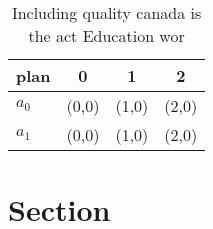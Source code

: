 \documentclass[a4paper]{article}
\begin{document}
\begin{table}
\begin{adjustbox}{width=0.5\columnwidth}
\begin{tabular}{|l|l|l|l|}
\hline
\textbf{plan} & \multicolumn{1}{c|}{\textbf{0}} & \multicolumn{1}{c|}{\textbf{1}} & \multicolumn{1}{c|}{\textbf{2}} \\ \hline
\textbf{$a_0$}  & (0,0) & (1,0) & (2,0) \\ \hline
\textbf{$a_1$}  & (0,0) & (1,0) & (2,0) \\ \hline
\end{tabular}
\end{adjustbox}
\caption{Including quality canada is the act Education wor
}
\end{table}

\section{Section}
\end{document}
